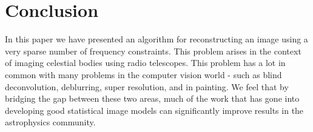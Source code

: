 

\section{Conclusion}


In this paper we have presented an algorithm for reconstructing an image using a very sparse number of frequency constraints. This problem arises in the context of imaging celestial bodies using radio telescopes. This problem has a lot in common with many problems in the computer vision world - such as blind deconvolution, deblurring, super resolution, and in painting. We feel that by bridging the gap between these two areas, much of the work that has gone into developing good statistical image models can significantly improve results in the astrophysics community. 
